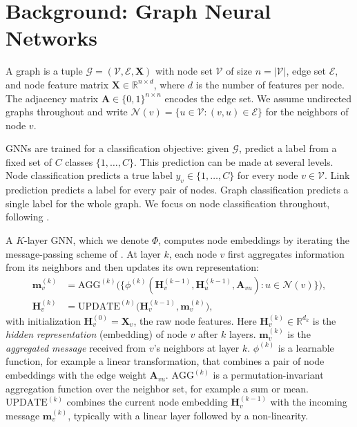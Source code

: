 \documentclass{article}
\newcommand{\reals}{\mathbb{R}}
\newcommand{\calG}{\mathcal{G}}
\newcommand{\calV}{\mathcal{V}}
\newcommand{\calE}{\mathcal{E}}
\newcommand{\calN}{\mathcal{N}}
\newcommand{\bfA}{\mathbf{A}}
\newcommand{\bfX}{\mathbf{X}}
\newcommand{\bfH}{\mathbf{H}}
\newcommand{\bfm}{\mathbf{m}}
\theoremstyle{definition}
\begin{document}
\section{Background: Graph Neural Networks}
\label{sec:background}

A graph is a tuple $\calG = (\calV, \calE, \bfX)$ with node set $\calV$ of
size $n = |\calV|$, edge set $\calE$, and node feature matrix
$\bfX \in \reals^{n \times d}$, where $d$ is the number of features per node.
The adjacency matrix $\bfA \in \{0,1\}^{n \times n}$ encodes the edge set. We
assume undirected graphs throughout and write
$\calN(v) = \{u \in \calV : (v,u) \in \calE\}$ for the neighbors of node $v$.

GNNs are trained for a classification objective: given $\calG$, predict a
label from a fixed set of $C$ classes $\{1, \dots, C\}$. This prediction can
be made at several levels. Node classification predicts a true label
$y_v \in \{1, \dots, C\}$ for every node $v \in \calV$. Link prediction
predicts a label for every pair of nodes. Graph classification predicts a
single label for the whole graph. We focus on node classification
throughout, following \citet{kipf2017semi}.

A $K$-layer GNN, which we denote $\Phi$, computes node embeddings by
iterating the message-passing scheme of \citet{gilmer2017neural}. At layer
$k$, each node $v$ first aggregates information from its neighbors and then
updates its own representation:
\begin{align}
  \bfm_v^{(k)} &= \mathrm{AGG}^{(k)}\!\bigl(
    \{\phi^{(k)}(\bfH_v^{(k-1)}, \bfH_u^{(k-1)}, \bfA_{vu})
      : u \in \calN(v)\}\bigr), \label{eq:agg} \\
  \bfH_v^{(k)} &= \mathrm{UPDATE}^{(k)}\!\bigl(\bfH_v^{(k-1)},
                                                 \bfm_v^{(k)}\bigr),
  \label{eq:update}
\end{align}
with initialization $\bfH_v^{(0)} = \bfX_v$, the raw node features. Here
$\bfH_v^{(k)} \in \reals^{d_k}$ is the \emph{hidden representation}
(embedding) of node $v$ after $k$ layers. $\bfm_v^{(k)}$ is the
\emph{aggregated message} received from $v$'s neighbors at layer $k$.
$\phi^{(k)}$ is a learnable function, for example a linear transformation,
that combines a pair of node embeddings with the edge weight $\bfA_{vu}$.
$\mathrm{AGG}^{(k)}$ is a permutation-invariant aggregation function over the
neighbor set, for example a sum or mean. $\mathrm{UPDATE}^{(k)}$ combines the
current node embedding $\bfH_v^{(k-1)}$ with the incoming message
$\bfm_v^{(k)}$, typically with a linear layer followed by a non-linearity.
\end{document}

